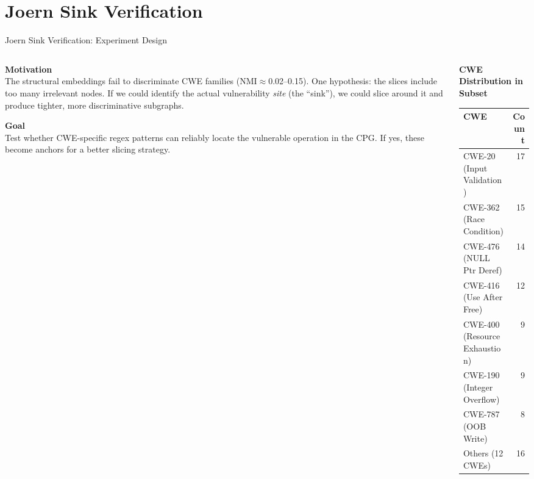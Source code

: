 \documentclass[aspectratio=169,10pt]{beamer}
\begin{document}
\section{Joern Sink Verification}

\begin{frame}{Joern Sink Verification: Experiment Design}
\begin{columns}[T]
\begin{column}{0.50\textwidth}

  \textbf{Motivation}\\[3pt]
  {\small The structural embeddings fail to discriminate CWE families
  (NMI$\approx$0.02--0.15). One hypothesis: the slices include too many
  irrelevant nodes. If we could identify the actual vulnerability
  \emph{site} (the ``sink''), we could slice around it and produce
  tighter, more discriminative subgraphs.}

  \vspace{0.4em}
  \textbf{Goal}\\[3pt]
  {\small Test whether CWE-specific regex patterns can reliably
  locate the vulnerable operation in the CPG. If yes, these become
  anchors for a better slicing strategy.}


\end{column}
\begin{column}{0.47\textwidth}

  {\small\textbf{CWE Distribution in Subset}}\\[4pt]
  {\scriptsize
  \renewcommand{\arraystretch}{1.2}
  \begin{tabular}{lr}
    \toprule
    \textbf{CWE} & \textbf{Count} \\
    \midrule
    CWE-20 (Input Validation) & 17 \\
    CWE-362 (Race Condition) & 15 \\
    CWE-476 (NULL Ptr Deref) & 14 \\
    CWE-416 (Use After Free) & 12 \\
    CWE-400 (Resource Exhaustion) & 9 \\
    CWE-190 (Integer Overflow) & 9 \\
    CWE-787 (OOB Write) & 8 \\
    Others (12 CWEs) & 16 \\
    \bottomrule
  \end{tabular}}
  

\end{column}
\end{columns}
\end{frame}
\end{document}
